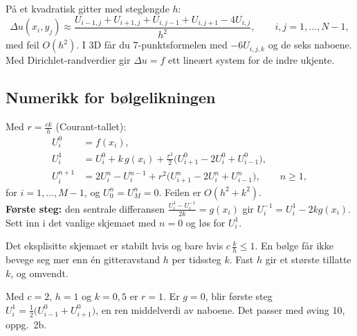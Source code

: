 \begin{formel}
På et kvadratisk gitter med steglengde $h$:
\[
\Delta u(x_i,y_j)\approx\frac{U_{i-1,j}+U_{i+1,j}+U_{i,j-1}+U_{i,j+1}-4U_{i,j}}{h^2},\qquad i,j=1,\dots,N-1,
\]
med feil $O(h^2)$. I 3D får du 7-punktsformelen med $-6U_{i,j,k}$ og de seks naboene. Med Dirichlet-randverdier gir $\Delta u=f$ ett lineært system for de indre ukjente.
\end{formel}

\subsection{Numerikk for bølgelikningen}
\begin{formel}[Eksplisitt skjema for $u_{tt}=c^2u_{xx}$ med $u=0$ i endene]
Med $r=\frac{ck}h$ (Courant-tallet):
\begin{align*}
U_i^0&=f(x_i),\\
U_i^1&=U_i^0+k\,g(x_i)+\frac{r^2}2\bigl(U_{i+1}^0-2U_i^0+U_{i-1}^0\bigr),\\
U_i^{n+1}&=2U_i^n-U_i^{n-1}+r^2\bigl(U_{i+1}^n-2U_i^n+U_{i-1}^n\bigr),\qquad n\ge1,
\end{align*}
for $i=1,\dots,M-1$, og $U_0^n=U_M^n=0$. Feilen er $O(h^2+k^2)$.\\
\textbf{Første steg:} den sentrale differansen $\frac{U_i^1-U_i^{-1}}{2k}=g(x_i)$ gir $U_i^{-1}=U_i^1-2kg(x_i)$. Sett inn i det vanlige skjemaet med $n=0$ og løs for $U_i^1$.
\end{formel}
\begin{teorem}
Det eksplisitte skjemaet er stabilt hvis og bare hvis $c\,\frac kh\le1$. En bølge får ikke bevege seg mer enn én gitteravstand $h$ per tidssteg $k$. Fast $h$ gir et største tillatte $k$, og omvendt.
\end{teorem}
\begin{eksempel}[$r=1$]
Med $c=2$, $h=1$ og $k=0{,}5$ er $r=1$. Er $g=0$, blir første steg $U_i^1=\frac12\bigl(U_{i-1}^0+U_{i+1}^0\bigr)$, en ren middelverdi av naboene. Det passer med øving 10, oppg.~2b.
\end{eksempel}

